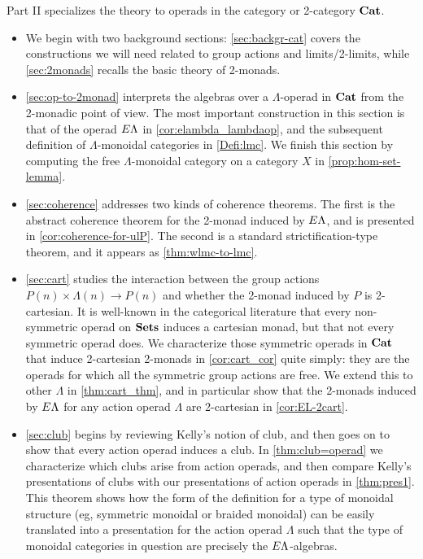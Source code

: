 Part II specializes the theory to operads in the category or 2-category $\mathbf{Cat}$. 
\begin{itemize}
\item We begin with two background sections: \cref{sec:backgr-cat} covers the constructions we will need related to group actions and limits/2-limits, while 
\cref{sec:2monads} recalls the basic theory of 2-monads.
\item \cref{sec:op-to-2monad} interprets the algebras over a $\Lambda$-operad in $\mathbf{Cat}$ from the 2-monadic point of view. The most important construction in this section is that of the operad $E\Lambda$ in \cref{cor:elambda_lambdaop}, and the subsequent definition of $\Lambda$-monoidal categories in \cref{Defi:lmc}. We finish this section by computing the free $\Lambda$-monoidal category on a category $X$ in \cref{prop:hom-set-lemma}.
\item \cref{sec:coherence} addresses two kinds of coherence theorems. The first is the abstract coherence theorem for the 2-monad induced by $E\Lambda$, and is presented in \cref{cor:coherence-for-ulP}. The second is a standard strictification-type theorem, and it appears as \cref{thm:wlmc-to-lmc}.
\item \cref{sec:cart} studies the interaction between the group actions $P(n) \times \Lambda(n) \to P(n)$ and whether the 2-monad induced by $P$ is 2-cartesian. It is well-known in the categorical literature that every non-symmetric operad on $\mathbf{Sets}$ induces a cartesian monad, but that not every symmetric operad does. We characterize those symmetric operads in $\mathbf{Cat}$ that induce 2-cartesian 2-monads in \cref{cor:cart_cor} quite simply: they are the operads for which all the symmetric group actions are free. We extend this to other $\Lambda$ in \cref{thm:cart_thm}, and in particular show that the 2-monads induced by $E\Lambda$ for any action operad $\Lambda$ are 2-cartesian in \cref{cor:EL-2cart}.
\item \cref{sec:club} begins by reviewing Kelly's notion of club, and then goes on to show that every action operad induces a club. In \cref{thm:club=operad} we characterize which clubs arise from action operads, and then compare Kelly's presentations of clubs with our presentations of action operads in \cref{thm:pres1}. This theorem shows how the form of the definition for a type of monoidal structure (eg, symmetric monoidal or braided monoidal) can be easily translated into a presentation for the action operad $\Lambda$ such that the type of monoidal categories in question are precisely the $E\Lambda$-algebras.

\end{itemize}
